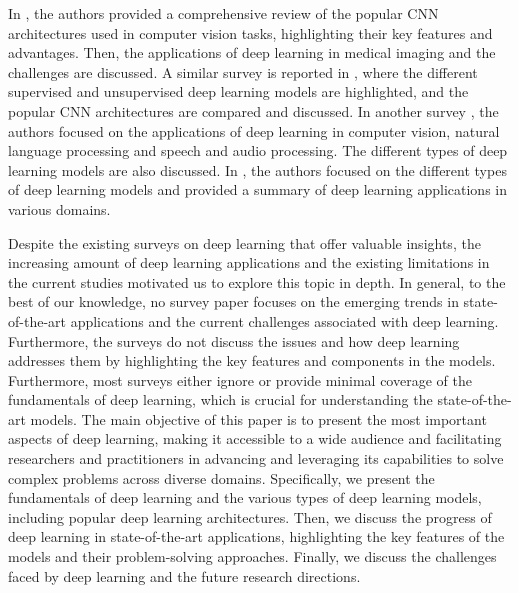 \documentclass[preprint,12pt]{elsarticle}
\begin{document}
In \citep{alzubaidi_review_2021}, the authors provided a comprehensive review of the popular CNN architectures used in computer vision tasks, highlighting their key features and advantages. Then, the applications of deep learning in medical imaging and the challenges are discussed. A similar survey is reported in \citep{alom_state_art_2019}, where the different supervised and unsupervised deep learning models are highlighted, and the popular CNN architectures are compared and discussed. In another survey \citep{pouyanfar_survey_2018}, the authors focused on the applications of deep learning in computer vision, natural language processing and speech and audio processing. The different types of deep learning models are also discussed. In \citep{sarker_deep_2021}, the authors focused on the different types of deep learning models and provided a summary of deep learning applications in various domains.

Despite the existing surveys on deep learning that offer valuable insights, the increasing amount of deep learning applications and the existing limitations in the current studies motivated us to explore this topic in depth. In general, to the best of our knowledge, no survey paper focuses on the emerging trends in state-of-the-art applications and the current challenges associated with deep learning. Furthermore, the surveys do not discuss the issues and how deep learning addresses them by highlighting the key features and components in the models. Furthermore, most surveys either ignore or provide minimal coverage of the fundamentals of deep learning, which is crucial for understanding the state-of-the-art models. The main objective of this paper is to present the most important aspects of deep learning, making it accessible to a wide audience and facilitating researchers and practitioners in advancing and leveraging its capabilities to solve complex problems across diverse domains. Specifically, we present the fundamentals of deep learning and the various types of deep learning models, including popular deep learning architectures. Then, we discuss the progress of deep learning in state-of-the-art applications, highlighting the key features of the models and their problem-solving approaches. Finally, we discuss the challenges faced by deep learning and the future research directions.
\end{document}
